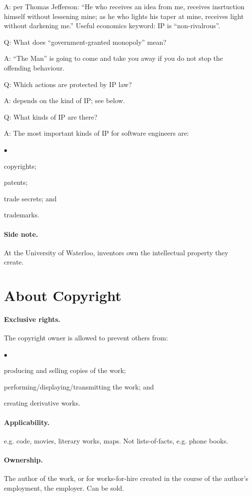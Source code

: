 \documentclass[11pt]{article}
\newcommand{\squishlist}{
 \begin{list}{$\bullet$}
  { \setlength{\itemsep}{0pt}
     \setlength{\parsep}{3pt}
     \setlength{\topsep}{3pt}
     \setlength{\partopsep}{0pt}
     \setlength{\leftmargin}{1.5em}
     \setlength{\labelwidth}{1em}
     \setlength{\labelsep}{0.5em} } }
\newcommand{\squishend}{
  \end{list}  }
\begin{document}
\noindent
A: per Thomas Jefferson: ``He who receives an idea from me, receives insrtuction himself without lessening mine; as he who lights his taper at mine, receives light without darkening me.'' Useful economics keyword: IP is ``non-rivalrous''.

\noindent
Q: What does ``government-granted monopoly'' mean?

\noindent
A: ``The Man'' is going to come and take you away if you do
not stop the offending behaviour.

\noindent
Q: Which actions are protected by IP law?

\noindent
A: depends on the kind of IP; see below.

\newpage
\noindent
Q: What kinds of IP are there?

\noindent
A: The most important kinds of IP for software engineers are:
\squishlist
\item copyrights;
\item patents;
\item trade secrets; and
\item trademarks.
\squishend

\paragraph{Side note.} At the University of Waterloo, inventors own the intellectual property
they create.

\section*{About Copyright}

\paragraph{Exclusive rights.} The copyright owner is allowed to prevent others from:
\squishlist
  \item producing and selling copies of the work;
  \item performing/displaying/transmitting the work; and
  \item creating derivative works.
\squishend

\paragraph{Applicability.} e.g. code, movies, literary works, maps. Not lists-of-facts,
e.g. phone books.

\paragraph{Ownership.} The author of the work, or for works-for-hire created in the
course of the author's employment, the employer. Can be sold.
\end{document}
